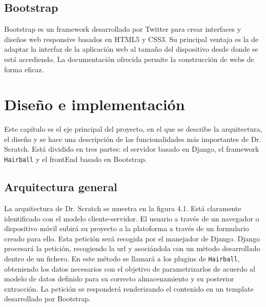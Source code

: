 \documentclass[a4paper, 12pt]{book}
\begin{document}
\section{Bootstrap}
\label{sec:seccion5}
Bootstrap es un framework desarrollado por Twitter para crear interfaces y diseños web responsive
basados en HTML5 y CSS3. Su principal ventaja es la de adaptar la interfaz de la aplicación web
al tamaño del dispositivo desde donde se está accediendo. La documentación ofrecida permite la
construcción de webs de forma eficaz.







\cleardoublepage
\chapter{Diseño e implementación}

Este capítulo es el eje principal del proyecto, en el que se describe la arquitectura,
el diseño y se hace una descripción de las funcionalidades más importantes de Dr.
Scratch. Está dividido en tres partes: el servidor basado en Django, el framework
\texttt{Hairball} y el frontEnd basado en Bootstrap.


\section{Arquitectura general}
\label{sec:arquitectura}

La arquitectura de Dr. Scratch se muestra en la figura 4.1. Está claramente identificado
con el modelo cliente-servidor. El usuario a través de un navegador o dispositivo móvil
subirá su proyecto a la platoforma a través de un formulario creado para ello. Esta 
petición será recogida por el manejador de Django. Django procesará la petición, recogiendo
la url y asociándola con un método desarrollado dentro de un fichero. En este método
se llamará a los plugins de \texttt{Hairball}, obteniendo los datos necesarios con el
objetivo de parametrizarlos de acuerdo  al modelo de datos definido para su correcto 
almacenamiento y su posterior extracción. La petición se responderá renderizando 
el contenido en un template desarrollado por Bootstrap. \\
\end{document}
